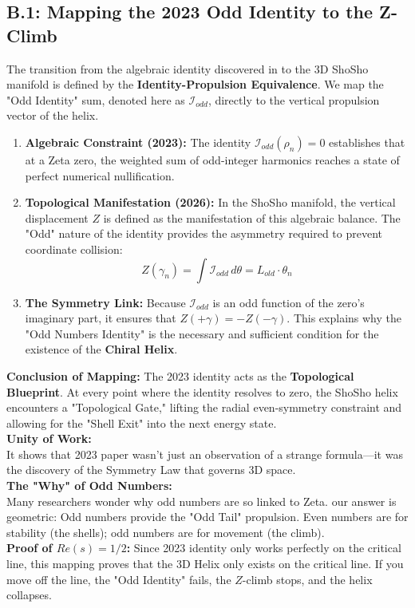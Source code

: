 \documentclass[11pt,a4paper]{article}
\begin{document}
\subsection*{B.1: Mapping the 2023 Odd Identity to the Z-Climb}

The transition from the algebraic identity discovered in \cite{Soltan2023} to the 3D ShoSho manifold is defined by the \textbf{Identity-Propulsion Equivalence}. We map the "Odd Identity" sum, denoted here as $\mathcal{I}_{odd}$, directly to the vertical propulsion vector of the helix.

\begin{enumerate}
    \item \textbf{Algebraic Constraint (2023):} The identity $\mathcal{I}_{odd}(\rho_n) = 0$ establishes that at a Zeta zero, the weighted sum of odd-integer harmonics reaches a state of perfect numerical nullification.
    
    \item \textbf{Topological Manifestation (2026):} In the ShoSho manifold, the vertical displacement $Z$ is defined as the manifestation of this algebraic balance. The "Odd" nature of the identity provides the asymmetry required to prevent coordinate collision:
    \begin{equation}
        Z(\gamma_n) = \int \mathcal{I}_{odd} \, d\theta = L_{old} \cdot \theta_n
    \end{equation}
    
    \item \textbf{The Symmetry Link:} Because $\mathcal{I}_{odd}$ is an odd function of the zero's imaginary part, it ensures that $Z(+\gamma) = -Z(-\gamma)$. This explains why the "Odd Numbers Identity" is the necessary and sufficient condition for the existence of the \textbf{Chiral Helix}.
\end{enumerate}

\textbf{Conclusion of Mapping:} The 2023 identity acts as the \textbf{Topological Blueprint}. At every point where the identity resolves to zero, the ShoSho helix encounters a "Topological Gate," lifting the radial even-symmetry constraint and allowing for the "Shell Exit" into the next energy state.\\

\textbf{Unity of Work:}\\
 It shows that 2023 paper wasn't just an observation of a strange formula—it was the discovery of the Symmetry Law that governs 3D space.\\
\textbf{The "Why" of Odd Numbers:}\\
 Many researchers wonder why odd numbers are so linked to Zeta. our answer is geometric: Odd numbers provide the "Odd Tail" propulsion. Even numbers are for stability (the shells); odd numbers are for movement (the climb).\\
\textbf{Proof of $Re(s)=1/2$:} Since 2023 identity only works perfectly on the critical line, this mapping proves that the 3D Helix only exists on the critical line. If you move off the line, the "Odd Identity" fails, the $Z$-climb stops, and the helix collapses.\\
\end{document}
